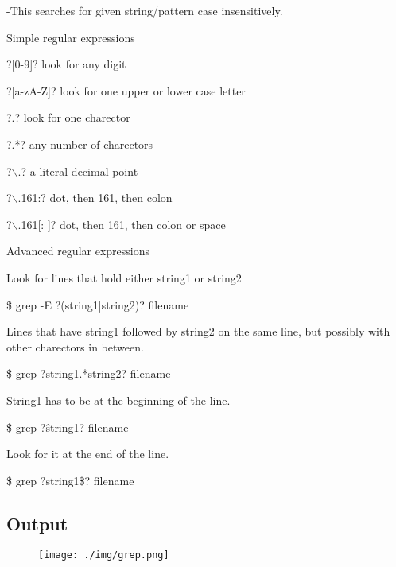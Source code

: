 \documentclass{article}
\begin{document}
				\hspace{10mm}-This searches for given string/pattern case insensitively.


	Simple regular expressions

				\hspace{10mm}?[0-9]? look for any digit



				\hspace{10mm}?[a-zA-Z]? look for one upper or lower case letter	


				\hspace{10mm}?.? look for one charector
				
				\hspace{10mm}?.*? any number of charectors
				
				\hspace{10mm} ?$\backslash$.? a literal decimal point
				
				\hspace{10mm}?$\backslash$.161:? dot, then 161, then colon 
				
				\hspace{10mm}?$\backslash$.161[: ]? dot, then 161, then colon or space	


	Advanced regular expressions

				\hspace{10mm}Look for lines that hold either string1 or string2
				
				\hspace{10mm}\$ grep -E ?(string1|string2)? filename 
				
				\hspace{10mm}Lines that have string1 followed by string2 on the same line, but possibly with other charectors in between.
				
				\hspace{10mm}\$ grep ?string1.*string2? filename	
				
				\hspace{10mm}String1 has to be at the beginning of the line.
				
				\hspace{10mm}\$ grep ?\^string1? filename
				
				Look for it at the end of the line.
				
				\hspace{10mm}\$ grep ?string1\$? filename

\subsection{Output}
\newpage
\begin{figure}[h!]
	\texttt{[image: ./img/grep.png]}
\end{figure}	
\newpage
\end{document}
